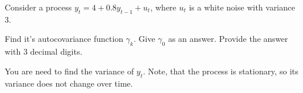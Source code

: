 
\begin{question}
Consider a process \(y_t = 4 + 0.8 y_{t-1} + u_t\), where \(u_t\) is a white noise with variance 3.

Find it's autocovariance function \(\gamma_k\). Give \(\gamma_0\) as an answer. Provide the answer with 3 decimal digits.
\end{question}

\begin{solution}
You are need to find the variance of \(y_t\). Note, that the process is stationary, so its variance does not change over time.
\end{solution}

